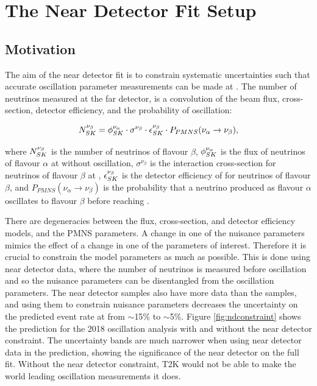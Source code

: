 \newpage
\newpage
\chapter{The Near Detector Fit Setup}\label{sec:FitSetup}
\section{Motivation}

The aim of the near detector fit is to constrain systematic uncertainties such that accurate oscillation parameter measurements can be made at \SK. The number of neutrinos measured at the far detector, is a convolution of the beam flux, cross-section, detector efficiency, and the probability of oscillation:

\begin{equation}
N^{\nu_{\beta}}_{SK} = \phi^{\nu_\alpha}_{SK} \cdot \sigma^{\nu_{\beta}} \cdot \epsilon^{\nu_{\beta}}_{SK} \cdot P_{PMNS}(\nu_{\alpha}\rightarrow\nu_{\beta}),
\end{equation}

where $N^{\nu_\beta}_{SK}$ is the number of neutrinos of flavour $\beta$, $\phi^{\nu_\alpha}_{SK}$ is the flux of neutrinos of flavour $\alpha$ at \SK without oscillation, $\sigma^{\nu_{\beta}}$ is the interaction cross-section for neutrinos of flavour $\beta$ at \SK, $\epsilon^{\nu_\beta}_{SK} $ is the detector efficiency of \SK for neutrinos of flavour $\beta$, and $P_{PMNS}(\nu_{\alpha}\rightarrow\nu_{\beta})$ is the probability that a neutrino produced as flavour $\alpha$ oscillates to flavour $\beta$ before reaching \SK.

There are degeneracies between the flux, cross-section, and detector efficiency models, and the PMNS parameters. A change in one of the nuisance parameters mimics the effect of a change in one of the parameters of interest. Therefore it is crucial to constrain the model parameters as much as possible. This is done using near detector data, where the number of neutrinos is measured before oscillation and so the  nuisance parameters can be disentangled from the oscillation parameters. The near detector samples also have more data than the \SK samples, and using them to constrain nuisance parameters decreases the uncertainty on the predicted event rate at \SK from $\sim$15$\%$ to $\sim$5$\%$. Figure \ref{fig:ndconstraint} shows the \SK prediction for the 2018 oscillation analysis with and without the near detector constraint. The uncertainty bands are much narrower when using near detector data in the prediction, showing the significance of the near detector on the full fit. Without the near detector constraint, T2K would not be able to make the world leading oscillation measurements it does.

